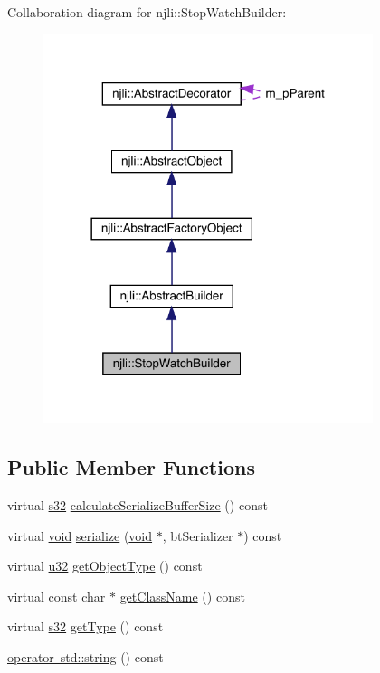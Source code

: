 Collaboration diagram for njli\+:\+:Stop\+Watch\+Builder\+:\nopagebreak
\begin{figure}[H]
\begin{center}
\leavevmode
\includegraphics[width=273pt]{classnjli_1_1_stop_watch_builder__coll__graph}
\end{center}
\end{figure}
\subsection*{Public Member Functions}
\begin{DoxyCompactItemize}
\item 
virtual \mbox{\hyperlink{_util_8h_aa62c75d314a0d1f37f79c4b73b2292e2}{s32}} \mbox{\hyperlink{classnjli_1_1_stop_watch_builder_a90aa404feeff480b3ca1e7fedd18ada8}{calculate\+Serialize\+Buffer\+Size}} () const
\item 
virtual \mbox{\hyperlink{_thread_8h_af1e856da2e658414cb2456cb6f7ebc66}{void}} \mbox{\hyperlink{classnjli_1_1_stop_watch_builder_a4d6eef341617c4aaef84da6353c06774}{serialize}} (\mbox{\hyperlink{_thread_8h_af1e856da2e658414cb2456cb6f7ebc66}{void}} $\ast$, bt\+Serializer $\ast$) const
\item 
virtual \mbox{\hyperlink{_util_8h_a10e94b422ef0c20dcdec20d31a1f5049}{u32}} \mbox{\hyperlink{classnjli_1_1_stop_watch_builder_aabc8d1041bab20e0b6b5618be2713096}{get\+Object\+Type}} () const
\item 
virtual const char $\ast$ \mbox{\hyperlink{classnjli_1_1_stop_watch_builder_a186409ee0a19e75489cdab4bcf580d3a}{get\+Class\+Name}} () const
\item 
virtual \mbox{\hyperlink{_util_8h_aa62c75d314a0d1f37f79c4b73b2292e2}{s32}} \mbox{\hyperlink{classnjli_1_1_stop_watch_builder_a1be64d37292e7b7a889faf7f4fc4c713}{get\+Type}} () const
\item 
\mbox{\hyperlink{classnjli_1_1_stop_watch_builder_a3cc00b5e50e5b6b4548a1bdc8bd58fff}{operator std\+::string}} () const
\end{DoxyCompactItemize}
